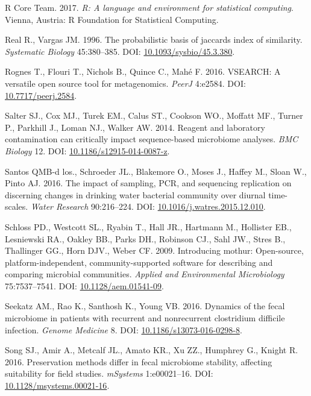 \documentclass[12pt,]{article}
\begin{document}
\hypertarget{ref-r_citation_2017}{}
R Core Team. 2017. \emph{R: A language and environment for statistical
computing}. Vienna, Austria: R Foundation for Statistical Computing.

\hypertarget{ref-Real1996}{}
Real R., Vargas JM. 1996. The probabilistic basis of jaccards index of
similarity. \emph{Systematic Biology} 45:380--385. DOI:
\href{https://doi.org/10.1093/sysbio/45.3.380}{10.1093/sysbio/45.3.380}.

\hypertarget{ref-vsearch_Rognes_2016}{}
Rognes T., Flouri T., Nichols B., Quince C., Mahé F. 2016. VSEARCH: A
versatile open source tool for metagenomics. \emph{PeerJ} 4:e2584. DOI:
\href{https://doi.org/10.7717/peerj.2584}{10.7717/peerj.2584}.

\hypertarget{ref-contamination_Salter2014}{}
Salter SJ., Cox MJ., Turek EM., Calus ST., Cookson WO., Moffatt MF.,
Turner P., Parkhill J., Loman NJ., Walker AW. 2014. Reagent and
laboratory contamination can critically impact sequence-based microbiome
analyses. \emph{BMC Biology} 12. DOI:
\href{https://doi.org/10.1186/s12915-014-0087-z}{10.1186/s12915-014-0087-z}.

\hypertarget{ref-BautistadelosSantos2016}{}
Santos QMB-d los., Schroeder JL., Blakemore O., Moses J., Haffey M.,
Sloan W., Pinto AJ. 2016. The impact of sampling, PCR, and sequencing
replication on discerning changes in drinking water bacterial community
over diurnal time-scales. \emph{Water Research} 90:216--224. DOI:
\href{https://doi.org/10.1016/j.watres.2015.12.010}{10.1016/j.watres.2015.12.010}.

\hypertarget{ref-mothur_schloss_2009}{}
Schloss PD., Westcott SL., Ryabin T., Hall JR., Hartmann M., Hollister
EB., Lesniewski RA., Oakley BB., Parks DH., Robinson CJ., Sahl JW.,
Stres B., Thallinger GG., Horn DJV., Weber CF. 2009. Introducing mothur:
Open-source, platform-independent, community-supported software for
describing and comparing microbial communities. \emph{Applied and
Environmental Microbiology} 75:7537--7541. DOI:
\href{https://doi.org/10.1128/aem.01541-09}{10.1128/aem.01541-09}.

\hypertarget{ref-erin_seekatz_2016}{}
Seekatz AM., Rao K., Santhosh K., Young VB. 2016. Dynamics of the fecal
microbiome in patients with recurrent and nonrecurrent clostridium
difficile infection. \emph{Genome Medicine} 8. DOI:
\href{https://doi.org/10.1186/s13073-016-0298-8}{10.1186/s13073-016-0298-8}.

\hypertarget{ref-preservation_Song_2016}{}
Song SJ., Amir A., Metcalf JL., Amato KR., Xu ZZ., Humphrey G., Knight
R. 2016. Preservation methods differ in fecal microbiome stability,
affecting suitability for field studies. \emph{mSystems} 1:e00021--16.
DOI:
\href{https://doi.org/10.1128/msystems.00021-16}{10.1128/msystems.00021-16}.
\end{document}
